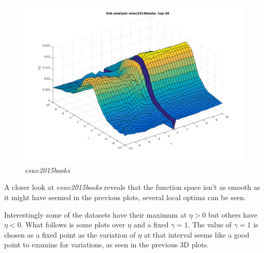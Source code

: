 \FloatBarrier

\begin{figure}[h!]
    \includegraphics[width=\textwidth]{fig/link_eta_gamma/eswc2015books_link.png}
    \caption{\textit{eswc2015books}}
\end{figure}

\FloatBarrier

A closer look at \textit{eswc2015books} reveals that the function space isn't as smooth as it might have seemed in the previous plots, several local optima can be seen.

\newpage

Interestingly some of the datasets have their maximum at $\eta > 0$ but others have $\eta < 0$. What follows is some plots over $\eta$ and a fixed $\gamma = 1$. The value of $\gamma = 1$ is chosen as a fixed point as the variation of $\eta$ at that interval seems like a good point to examine for variations, as seen in the previous 3D plots.

\FloatBarrier

